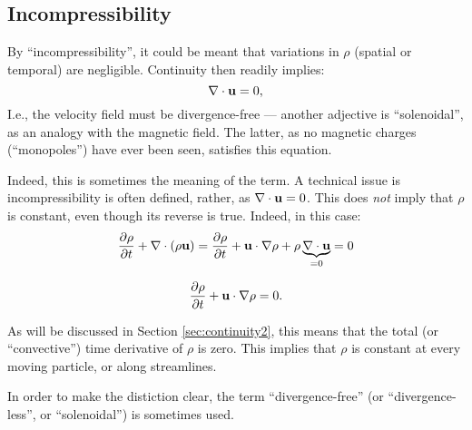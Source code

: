 \subsection{Incompressibility}
\label{sec:incompressibility}

By ``incompressibility'', it could be meant
that variations in $\rho$ (spatial or temporal) are
negligible. Continuity then readily implies:
\[
\nabla \cdot  \mathbf{u}  = 0 ,
\]
I.e., the velocity field must be divergence-free --- another adjective
is ``solenoidal'', as an analogy with the magnetic field. The latter,
as no magnetic charges (``monopoles'') have ever been seen, satisfies
this equation.

Indeed, this is sometimes the meaning of the term.  A technical issue
is incompressibility is often defined, rather, as
$\nabla \cdot \mathbf{u} = 0 $. This does \emph{not} imply that $\rho$ is
constant, even though its reverse is true. Indeed, in this case:
\[
\frac{\partial \rho }{\partial t} +  \nabla \cdot (\rho \mathbf{u} ) =
\frac{\partial \rho }{\partial t} +   \mathbf{u} \cdot \nabla \rho
+ \rho \underbrace{\nabla \cdot \mathbf{u}}_{=0} = 0
\]

\[
\frac{\partial \rho }{\partial t} +   \mathbf{u} \cdot \nabla \rho = 0 .
\]

As will be discussed in Section \ref{sec:continuity2}, this means that the
total (or ``convective'') time derivative of $\rho$ is zero. This
implies that $\rho$ is constant at every moving particle, or along
streamlines.

In order to make the distiction clear, the term ``divergence-free'' (or
``divergence-less'', or ``solenoidal'') is sometimes used.
